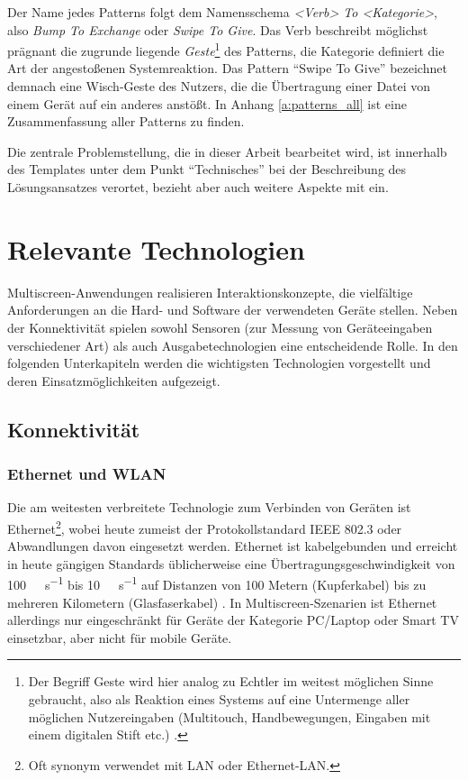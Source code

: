 Der Name jedes Patterns folgt dem Namensschema \textit{<Verb> To <Kategorie>}, also \zb \textit{Bump To Exchange} oder \textit{Swipe To Give}. Das Verb beschreibt möglichst prägnant die zugrunde liegende \textit{Geste}\footnote{Der Begriff Geste wird hier analog zu Echtler im weitest möglichen Sinne gebraucht, also als Reaktion eines Systems auf eine Untermenge aller möglichen Nutzereingaben (Multitouch, Handbewegungen, Eingaben mit einem digitalen Stift etc.)  \citep{Echtler2012}.} des Patterns, die Kategorie definiert die Art der angestoßenen Systemreaktion. Das Pattern "`Swipe To Give"' bezeichnet demnach eine Wisch-Geste des Nutzers, die die Übertragung einer Datei von einem Gerät auf ein anderes anstößt. In Anhang \ref{a:patterns_all} ist eine Zusammenfassung aller Patterns zu finden.

Die zentrale Problemstellung, die in dieser Arbeit bearbeitet wird, ist innerhalb des Templates unter dem Punkt "`Technisches"' bei der Beschreibung des Lösungsansatzes verortet, bezieht aber auch weitere Aspekte mit ein.

\section{Relevante Technologien}
Multiscreen-Anwendungen realisieren Interaktionskonzepte, die vielfältige Anforderungen an die Hard- und Software der verwendeten Geräte stellen. Neben der Konnektivität spielen sowohl Sensoren (zur Messung von Geräteeingaben verschiedener Art) als auch Ausgabetechnologien eine entscheidende Rolle.
In den folgenden Unterkapiteln werden die wichtigsten Technologien vorgestellt und deren Einsatzmöglichkeiten aufgezeigt.

\subsection{Konnektivität}
\label{subsec:connectivity}
\subsubsection{Ethernet und WLAN}
Die am weitesten verbreitete Technologie zum Verbinden von Geräten ist Ethernet\footnote{Oft synonym verwendet mit \ac{LAN} oder Ethernet-LAN.}, wobei heute zumeist der Protokollstandard IEEE 802.3 oder Abwandlungen davon eingesetzt werden. Ethernet ist kabelgebunden und erreicht in heute gängigen Standards üblicherweise eine Übertragungsgeschwindigkeit von \SI{100}{\mega\Bit\per\second} bis \SI{10}{\giga\Bit\per\second} auf Distanzen von 100 Metern (Kupferkabel) bis zu mehreren Kilometern (Glasfaserkabel) \citep[506-507]{Kurose2014}. In Multiscreen-Szenarien ist Ethernet allerdings nur eingeschränkt für Geräte der Kategorie PC/Laptop oder Smart TV einsetzbar, aber nicht für mobile Geräte.

